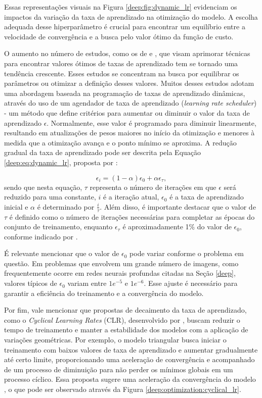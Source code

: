 Essas representações visuais na Figura \ref{deep:fig:dynamic_lr} evidenciam os impactos da variação da taxa de aprendizado na otimização do modelo. A escolha adequada desse hiperparâmetro é crucial para encontrar um equilíbrio entre a velocidade de convergência e a busca pelo valor ótimo da função de custo.

O aumento no número de estudos, como os de \cite{Tang2021AnPump, Senior2013AnRecognition} e \cite{Smith2017CyclicalNetworks}, que visam aprimorar técnicas para encontrar valores ótimos de taxas de aprendizado tem se tornado uma tendência crescente. Esses estudos se concentram na busca por equilibrar os parâmetros ou otimizar a definição desses valores. Muitos desses estudos adotam uma abordagem baseada na programação de taxas de aprendizado dinâmicas, através do uso de um agendador de taxa de aprendizado (\textit{learning rate scheduler}) - um método que define critérios para aumentar ou diminuir o valor da taxa de aprendizado $\epsilon$. Normalmente, esse valor é programado para diminuir linearmente, resultando em atualizações de pesos maiores no início da otimização e menores à medida que a otimização avança e o ponto mínimo se aproxima. A redução gradual da taxa de aprendizado pode ser descrita pela Equação \ref{deep:eq:dynamic_lr}, proposta por \cite{Goodfellow2016}:

\begin{equation}
\label{deep:eq:dynamic_lr}
\epsilon_i = (1 - \alpha) \epsilon_0 + \alpha\epsilon_\tau,
\end{equation}
sendo que nesta equação, $\tau$ representa o número de iterações em que $\epsilon$ será reduzido para uma constante, $i$ é a iteração atual, $\epsilon_0$ é a taxa de aprendizado inicial e $\alpha$ é determinado por $\frac{i}{\tau}$. Além disso, é importante destacar que o valor de $\tau$ é definido como o número de iterações necessárias para completar as épocas do conjunto de treinamento, enquanto $\epsilon_\tau$ é aproximadamente 1\% do valor de $\epsilon_0$, conforme indicado por \cite{Goodfellow2016}.

É relevante mencionar que o valor de $\epsilon_0$ pode variar conforme o problema em questão. Em problemas que envolvem um grande número de imagens, como frequentemente ocorre em redes neurais profundas citadas na Seção \ref{deep}, valores típicos de $\epsilon_0$ variam entre $1e^{-5}$ e $1e^{-6}$. Esse ajuste é necessário para garantir a eficiência do treinamento e a convergência do modelo.

Por fim, vale mencionar que propostas de decaimento da taxa de aprendizado, como o \textit{Cyclical Learning Rates} (CLR), desenvolvido por \cite{Smith2017CyclicalNetworks}, buscam reduzir o tempo de treinamento e manter a estabilidade dos modelos com a aplicação de variações geométricas. Por exemplo, o modelo triangular busca iniciar o treinamento com baixos valores de taxa de aprendizado e aumentar gradualmente até certo limite, proporcionando uma aceleração de convergência e acompanhado de um processo de diminuição para não perder os mínimos globais em um processo cíclico. Essa proposta sugere uma aceleração da convergência do modelo \citep{Smith2017CyclicalNetworks}, o que pode ser observado através da Figura \ref{deep:optimization:cyclical_lr}.

